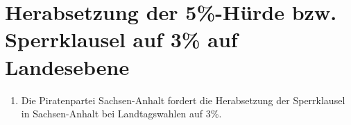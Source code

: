 \section{Herabsetzung der 5\%-Hürde bzw. Sperrklausel auf 3\% auf Landesebene}
\begin{enumerate}
\item Die Piratenpartei Sachsen-Anhalt fordert die Herabsetzung der Sperrklausel
in Sachsen-Anhalt bei Landtagswahlen auf 3\%. 
\end{enumerate}